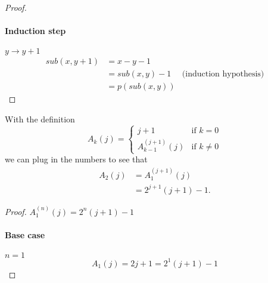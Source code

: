 \documentclass{article}
\begin{document}
\begin{tasks}
{\begin{proof}
                \paragraph{Induction step} \(y\to y+1\)
                \begin{displaymath}
                    \begin{aligned}
                        sub(x, y+1) 
                        &= x - y - 1 \\
                        &= sub(x, y) - 1 & \text{(induction hypothesis)} \\
                        &= p(sub(x, y))
                    \end{aligned}
                \end{displaymath}
            \end{proof}
        }
        \item {
            With the definition
            \begin{displaymath}
                A_k(j) = \begin{cases}
                    j+1 & \text{if } k = 0 \\
                    A_{k-1}^{(j+1)}(j) & \text{if } k \neq 0
                \end{cases}
            \end{displaymath}
            we can plug in the numbers to see that
            \begin{displaymath}
                \begin{aligned}
                    A_2(j)
                    &= A_1^{(j+1)}(j) \\
                    &= 2^{j+1}(j+1) - 1.
                \end{aligned}
            \end{displaymath}
            \begin{proof}
                \(A_1^{(n)}(j) = 2^n(j + 1) - 1\)
                \paragraph{Base case} \(n = 1\)
                \begin{displaymath}
                    A_1(j) = 2j + 1 = 2^1(j + 1) - 1
                \end{displaymath}


\end{proof}}
\end{tasks}
\end{document}
